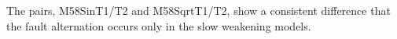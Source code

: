 
The pairs, M58SinT1/T2 and M58SqrtT1/T2, show a consistent difference that the fault alternation occurs only in the slow weakening models.






